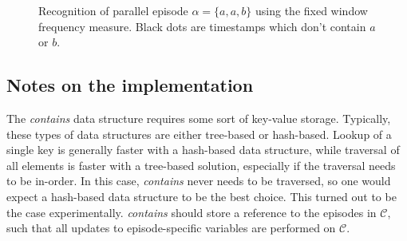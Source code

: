 \begin{figure}

\caption{Recognition of parallel episode $ \alpha = \{ a, a, b \} $ using the fixed window frequency measure. Black dots are timestamps which don't contain $ a $ or $ b $.}
\label{fig:parallel-recognition}
\end{figure}

\subsection{Notes on the implementation}

The \emph{contains} data structure requires some sort of key-value storage. Typically, these types of data structures are either  tree-based or hash-based. Lookup of a single key is generally faster with a hash-based data structure, while traversal of all elements is faster with a tree-based solution, especially if the traversal needs to be in-order. In this case, \emph{contains} never needs to be traversed, so one would expect a hash-based data structure to be the best choice. This turned out to be the case experimentally. \emph{contains} should store a reference to the episodes in $ \mathcal{C} $, such that all updates to episode-specific variables are performed on $ \mathcal{C} $.

